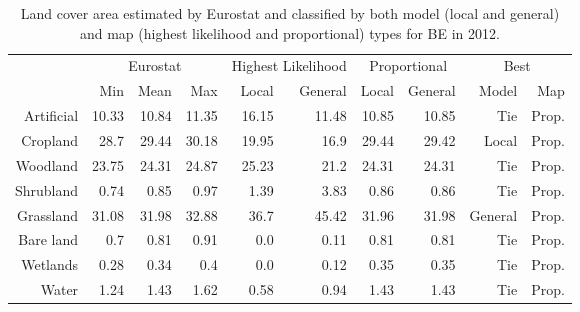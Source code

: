     \begin{table}[H]
    \centering
    \caption{Land cover area estimated by Eurostat and classified by both model (local and general) and map (highest likelihood and proportional) types for BE in 2012.}
    
    \begin{tabular}{r|rrr|rr|rr|rr}
    \toprule
    {} & \multicolumn{3}{|c}{Eurostat} & \multicolumn{2}{|c}{Highest Likelihood} & \multicolumn{2}{|c}{Proportional} & \multicolumn{2}{|c}{Best} \\
    {} &      Min &   Mean &    Max &              Local & General &        Local & General &    Model &    Map \\
    \midrule
    Artificial &    10.33 &  10.84 &  11.35 &              16.15 &   11.48 &        10.85 &   10.85 &      Tie &  Prop. \\
    Cropland   &     28.7 &  29.44 &  30.18 &              19.95 &    16.9 &        29.44 &   29.42 &    Local &  Prop. \\
    Woodland   &    23.75 &  24.31 &  24.87 &              25.23 &    21.2 &        24.31 &   24.31 &      Tie &  Prop. \\
    Shrubland  &     0.74 &   0.85 &   0.97 &               1.39 &    3.83 &         0.86 &    0.86 &      Tie &  Prop. \\
    Grassland  &    31.08 &  31.98 &  32.88 &               36.7 &   45.42 &        31.96 &   31.98 &  General &  Prop. \\
    Bare land  &      0.7 &   0.81 &   0.91 &                0.0 &    0.11 &         0.81 &    0.81 &      Tie &  Prop. \\
    Wetlands   &     0.28 &   0.34 &    0.4 &                0.0 &    0.12 &         0.35 &    0.35 &      Tie &  Prop. \\
    Water      &     1.24 &   1.43 &   1.62 &               0.58 &    0.94 &         1.43 &    1.43 &      Tie &  Prop. \\
    \bottomrule
    \end{tabular}
    \end{table}
    
